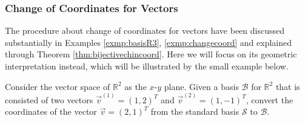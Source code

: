 \subsubsection{Change of Coordinates for Vectors}
The procedure about change of coordinates for vectors have been discussed substantially in Examples \ref{exmp:basisR3}, \ref{exmp:changecoord} and explained through Theorem \ref{thm:bijectivechincoord}. Here we will focus on its geometric interpretation instead, which will be illustrated by the small example below.

\begin{exmp}
\label{exmp:2Dtransform}
Consider the vector space of $\mathbb{R}^2$ as the $x$-$y$ plane. Given a basis $\mathcal{B}$ for $\mathbb{R}^2$ that is consisted of two vectors $\vec{v}^{(1)} = (1,2)^T$ and $\vec{v}^{(2)} = (1,-1)^T$, convert the coordinates of the vector $\vec{v} = (2,1)^T$ from the standard basis $\mathcal{S}$ to $\mathcal{B}$.
\end{exmp}
